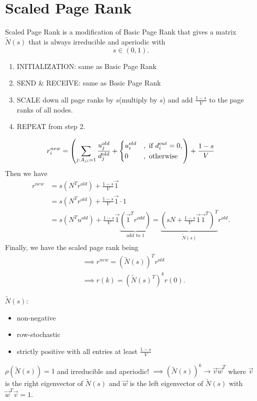 \section{Scaled Page Rank}
Scaled Page Rank is a modification of Basic Page Rank that gives a matrix \(\widetilde{N}(s)\) that is always irreducible and aperiodic with
\[
	s\in \left( 0, 1 \right).
\]
\begin{enumerate}
	\item INITIALIZATION: same as Basic Page Rank
	\item SEND \& RECEIVE: same as Basic Page Rank
	\item SCALE down all page ranks by \(s\)(multiply by \(s\)) and add \(\frac{1-s}{V}\) to the page ranks of all nodes.
	\item REPEAT from step 2.
\end{enumerate}

\[
	r_{i}^{new} = \left(\sum\limits_{j:A_{ji} = 1} \frac{u_{j}^{old}}{d_{j}^{old}}+\begin{dcases}
		u_{i}^{old} & , \text{ if }d_{i}^{out} = 0, \\
		0           & , \text{ otherwise}
	\end{dcases}\right)+\frac{1-s}{V}
\]
Then we have
\[
	\begin{split}
		r^{new} &= s(N^{T}r^{old})+\frac{1-s}{V}\vec{1}\\
		&= s(N^{T}r^{old})+\frac{1-s}{V}\vec{1}\cdot 1\\
		&= s(N^{T}u^{old}) + \frac{1-s}{V}\vec{1} \underbrace{(\vec{1}^{T}r^{odd})}_{\text{add to }1}
		= \underbrace{(sN + \frac{1-s}{V}\vec{1}\vec{1}^{T})^{T}}_{\widetilde{N}(s)} r^{old}.
	\end{split}
\]
Finally, we have the scaled page rank being
\[
	\begin{split}
		&\implies r^{new} = (\widetilde{N}(s))^{T}r^{old}\\
		&\implies r(k) = (\widetilde{N}(s)^{T})^k r(0).
	\end{split}
\]

\begin{note}
	\(\widetilde{N}(s)\):
	\begin{itemize}
		\item non-negative
		\item row-stochastic
		\item strictly positive with all entries at least \(\frac{1-s}{V}\)
	\end{itemize}
\end{note}
\(\rho(\widetilde{N}(s)) = 1\) and irreducible and aperiodic! \(\implies (\widetilde{N}(s))^k \to \vec{v}\vec{w}^{T}\) where
\(\vec{v}\) is the right eigenvector of \(\widetilde{N}(s)\) and \(\vec{w}\) is the left eigenvector of \(\widetilde{N}(s)\) with
\(\vec{w}^{T} \vec{v} = 1\).

